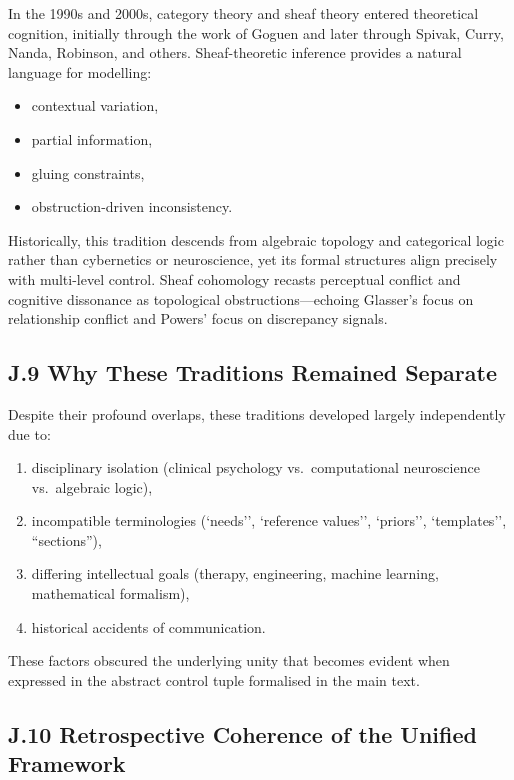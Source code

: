 \documentclass[11pt,a4paper,twoside]{article}
\begin{document}
In the 1990s and 2000s, category theory and sheaf theory entered theoretical cognition, initially through the work of Goguen and later through Spivak, Curry, Nanda, Robinson, and others.
Sheaf-theoretic inference provides a natural language for modelling:

\begin{itemize}
\item contextual variation,
\item partial information,
\item gluing constraints,
\item obstruction-driven inconsistency.
\end{itemize}

Historically, this tradition descends from algebraic topology and categorical logic rather than cybernetics or neuroscience, yet its formal structures align precisely with multi-level control.
Sheaf cohomology recasts perceptual conflict and cognitive dissonance as topological obstructions---echoing Glasser’s focus on relationship conflict and Powers’ focus on discrepancy signals.

\subsection*{J.9 Why These Traditions Remained Separate}

Despite their profound overlaps, these traditions developed largely independently due to:

\begin{enumerate}
\item disciplinary isolation (clinical psychology vs.\ computational neuroscience vs.\ algebraic logic),
\item incompatible terminologies (`needs'', `reference values'', `priors'', `templates'', ``sections''),
\item differing intellectual goals (therapy, engineering, machine learning, mathematical formalism),
\item historical accidents of communication.
\end{enumerate}

These factors obscured the underlying unity that becomes evident when expressed in the abstract control tuple formalised in the main text.

\subsection*{J.10 Retrospective Coherence of the Unified Framework}
\end{document}
